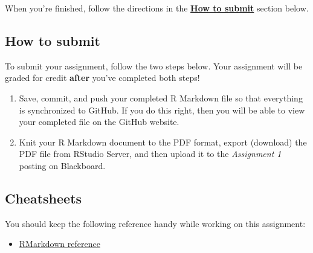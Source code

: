 \documentclass[
]{article}
\providecommand{\tightlist}{%
  \setlength{\itemsep}{0pt}\setlength{\parskip}{0pt}}
\begin{document}
When you're finished, follow the directions in the
\textbf{\protect\hyperlink{how-to-submit}{How to submit}} section below.

\hypertarget{how-to-submit}{%
\subsection{How to submit}\label{how-to-submit}}

To submit your assignment, follow the two steps below. Your assignment
will be graded for credit \textbf{after} you've completed both steps!

\begin{enumerate}
\def\labelenumi{\arabic{enumi}.}
\item
  Save, commit, and push your completed R Markdown file so that
  everything is synchronized to GitHub. If you do this right, then you
  will be able to view your completed file on the GitHub website.
\item
  Knit your R Markdown document to the PDF format, export (download) the
  PDF file from RStudio Server, and then upload it to the
  \emph{Assignment 1} posting on Blackboard.
\end{enumerate}

\hypertarget{cheatsheets}{%
\subsection{Cheatsheets}\label{cheatsheets}}

You should keep the following reference handy while working on this
assignment:

\begin{itemize}
\tightlist
\item
  \href{https://www.rstudio.com/wp-content/uploads/2015/03/rmarkdown-reference.pdf}{RMarkdown
  reference}
\end{itemize}
\end{document}
